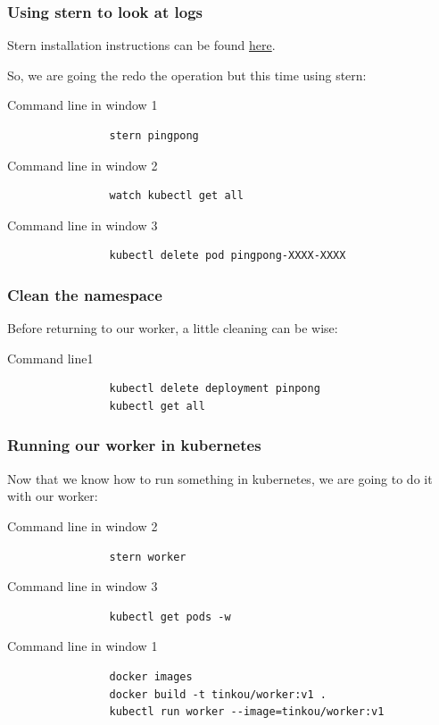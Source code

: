 	\begin{frame}[fragile]
		\frametitle{Using stern to look at logs}

		Stern installation instructions can be found \href{https://github.com/wercker/stern}{here}.
		
		\bigskip
		So, we are going the redo the operation but this time using stern:
		\begin{block}{Command line in window 1}
			\begin{verbatim}
				stern pingpong
			\end{verbatim}
		\end{block}
				\begin{block}{Command line in window 2}
			\begin{verbatim}
				watch kubectl get all
			\end{verbatim}
		\end{block}
		\begin{block}{Command line in window 3}
			\begin{verbatim}
				kubectl delete pod pingpong-XXXX-XXXX
			\end{verbatim}
		\end{block}
	\end{frame}
	
	\begin{frame}[fragile]
		\frametitle{Clean the namespace}
		
		Before returning to our worker, a little cleaning can be wise:
		\begin{block}{Command line1}
			\begin{verbatim}
				kubectl delete deployment pinpong
				kubectl get all
			\end{verbatim}
		\end{block}
	\end{frame}
	
	\begin{frame}[fragile]
		\frametitle{Running our worker in kubernetes}
		
		Now that we know how to run something in kubernetes, we are going to do it with our worker:
		\begin{block}{Command line in window 2}
			\begin{verbatim}
				stern worker
			\end{verbatim}
		\end{block}		
		\begin{block}{Command line in window 3}
			\begin{verbatim}
				kubectl get pods -w
			\end{verbatim}
		\end{block}
		\begin{block}{Command line in window 1}
			\begin{verbatim}
				docker images
				docker build -t tinkou/worker:v1 .
				kubectl run worker --image=tinkou/worker:v1
			\end{verbatim}
		\end{block}
	\end{frame}
	
